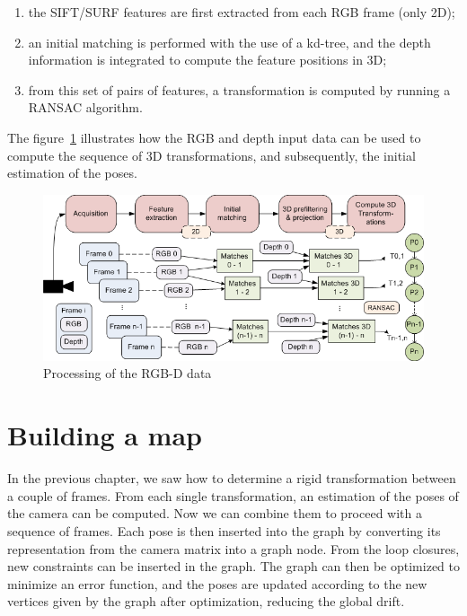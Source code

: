 \begin{enumerate}
\item the \gls{SIFT}/\gls{SURF} features are first extracted from each RGB frame (only 2D);
\item an initial matching is performed with the use of a kd-tree, and the depth information is integrated to compute the feature positions in 3D;
\item from this set of pairs of features, a transformation is computed by running a \gls{RANSAC} algorithm.
\end{enumerate}

The figure~\ref{fig:system_overview_rgb_depth} illustrates how the RGB and depth input data can be used to compute the sequence of 3D transformations, and subsequently, the initial estimation of the poses.

\begin{figure}[H]
\centering
\includegraphics[width=1.0\textwidth]{figures/overview_rgb_depth}
\caption{Processing of the RGB-D data}
\label{fig:system_overview_rgb_depth}
\end{figure}

\chapter{Building a map}
\label{chap:map}

In the previous chapter, we saw how to determine a rigid transformation between a couple of frames. From each single transformation, an estimation of the poses of the camera can be computed. Now we can combine them to proceed with a sequence of frames. Each pose is then inserted into the graph by converting its representation from the camera matrix into a graph node. From the loop closures, new constraints can be inserted in the graph. The graph can then be optimized to minimize an error function, and the poses are updated according to the new vertices given by the graph after optimization, reducing the global drift.


